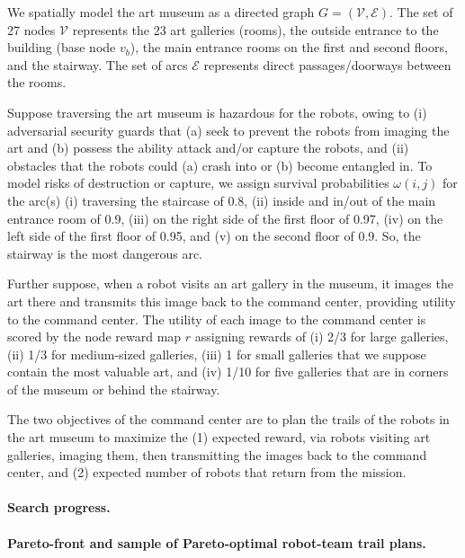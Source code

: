\documentclass[fleqn,10pt,lineno]{wlpeerj}
\begin{document}
We spatially model the art museum as a directed graph $G=(\mathcal{V}, \mathcal{E})$.
The set of 27 nodes $\mathcal{V}$ represents the 23 art galleries (rooms), the outside entrance to the building (base node $v_b$), the main entrance rooms on the first and second floors, and the stairway.
The set of arcs $\mathcal{E}$ represents direct passages/doorways between the rooms. 

Suppose traversing the art museum is hazardous for the robots, owing to
(i) adversarial security guards that (a) seek to prevent the robots from imaging the art and (b) possess the ability attack and/or capture the robots, and
(ii) obstacles that the robots could (a) crash into or (b) become entangled in.
To model risks of destruction or capture, we assign survival probabilities $\omega(i,j)$ for the arc(s)
(i) traversing the staircase of 0.8,
(ii) inside and in/out of the main entrance room of 0.9,
(iii) on the right side of the first floor of 0.97,
(iv) on the left side of the first floor of 0.95,
and
(v) on the second floor of 0.9.
So, the stairway is the most dangerous arc.

Further suppose, when a robot visits an art gallery in the museum, it images the art there and transmits this image back to the command center, providing utility to the command center. 
The utility of each image to the command center is scored by
the node reward map $r$ assigning rewards of
(i) 2/3 for large galleries,
(ii) 1/3 for medium-sized galleries,
(iii) 1 for small galleries that we suppose contain the most valuable art, and
(iv) 1/10 for five galleries that are in corners of the museum or behind the stairway.

The two objectives of the command center are to plan the trails of the robots in the art museum to maximize the (1) expected reward, via robots visiting art galleries, imaging them, then transmitting the images back to the command center, and (2) expected number of robots that return from the mission. 

\paragraph{Search progress.}

\paragraph{Pareto-front and sample of Pareto-optimal robot-team trail plans.}
\end{document}
